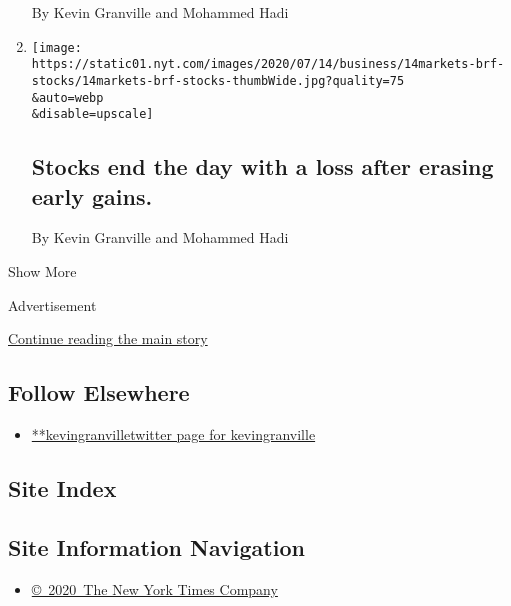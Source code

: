 \begin{enumerate}
  By Kevin Granville and Mohammed Hadi
\item
  \href{/2020/07/14/business/stocks-end-the-day-with-a-loss-after-erasing-early-gains.html}{}

  \texttt{[image: https://static01.nyt.com/images/2020/07/14/business/14markets-brf-stocks/14markets-brf-stocks-thumbWide.jpg?quality=75\\\&auto=webp\\\&disable=upscale]}

  \hypertarget{stocks-end-the-day-with-a-loss-after-erasing-early-gains}{%
  \subsection{Stocks end the day with a loss after erasing early
  gains.}\label{stocks-end-the-day-with-a-loss-after-erasing-early-gains}}

  By Kevin Granville and Mohammed Hadi
\end{enumerate}

Show More

Advertisement

\protect\hyperlink{after-mid2}{Continue reading the main story}

\hypertarget{follow-elsewhere}{%
\subsection{Follow Elsewhere}\label{follow-elsewhere}}

\begin{itemize}
\tightlist
\item
  \href{https://twitter.com/kevingranville}{**kevingranvilletwitter page
  for kevingranville}
\end{itemize}

\hypertarget{site-index}{%
\subsection{Site Index}\label{site-index}}

\hypertarget{site-information-navigation}{%
\subsection{Site Information
Navigation}\label{site-information-navigation}}

\begin{itemize}
\tightlist
\item
  \href{https://help.nytimes.com/hc/en-us/articles/115014792127-Copyright-notice}{©~2020~The
  New York Times Company}
\end{itemize}

